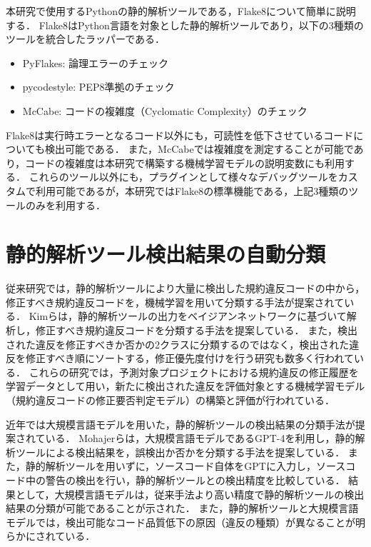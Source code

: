 \documentclass[11pt]{jreport}
\begin{document}
本研究で使用するPythonの静的解析ツールである，Flake8について簡単に説明する．
Flake8はPython言語を対象とした静的解析ツールであり，以下の3種類のツールを統合したラッパーである．

\begin{itemize}
    \item PyFlakes: 論理エラーのチェック
    \item pycodestyle: PEP8準拠のチェック
    \item McCabe: コードの複雑度（Cyclomatic Complexity）のチェック
\end{itemize}

Flake8は実行時エラーとなるコード以外にも，可読性を低下させているコードについても検出可能である．
また，McCabeでは複雑度を測定することが可能であり，コードの複雑度は本研究で構築する機械学習モデルの説明変数にも利用する．
これらのツール以外にも，プラグインとして様々なデバッグツールをカスタムで利用可能であるが，本研究ではFlake8の標準機能である，上記3種類のツールのみを利用する．

\section{静的解析ツール検出結果の自動分類}\label{sec:zyuuraikennkyuu}


従来研究では，静的解析ツールにより大量に検出した規約違反コードの中から，修正すべき規約違反コードを，機械学習を用いて分類する手法が提案されている\cite{JyuraiPre}\cite{エネス}\cite{tsiazhkorob2024classification}．
Kimらは，静的解析ツールの出力をベイジアンネットワークに基づいて解析し，修正すべき規約違反コードを分類する手法を提案している\cite{beizu}．
また，検出された違反を修正すべきか否かの2クラスに分類するのではなく，検出された違反を修正すべき順にソートする，修正優先度付けを行う研究も数多く行われている\cite{Wang}\cite{Qing}\cite{HowFar}．
これらの研究では，予測対象プロジェクトにおける規約違反の修正履歴を学習データとして用い，新たに検出された違反を評価対象とする機械学習モデル（規約違反コードの修正要否判定モデル）の構築と評価が行われている．

近年では大規模言語モデルを用いた，静的解析ツールの検出結果の分類手法が提案されている．
Mohajerらは，大規模言語モデルであるGPT-4を利用し，静的解析ツールによる検出結果を，誤検出か否かを分類する手法を提案している\cite{LLMで分類}．
また，静的解析ツールを用いずに，ソースコード自体をGPTに入力し，ソースコード中の警告の検出を行い，静的解析ツールとの検出精度を比較している．
結果として，大規模言語モデルは，従来手法より高い精度で静的解析ツールの検出結果の分類が可能であることが示された．
また，静的解析ツールと大規模言語モデルでは，検出可能なコード品質低下の原因（違反の種類）が異なることが明らかにされている．
\end{document}
